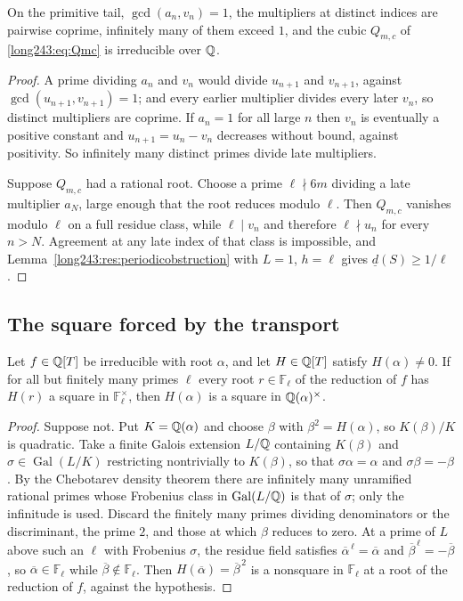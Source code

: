 \documentclass[11pt]{article}
\newcommand{\Fp}{\mathbb{F}}
\DeclareMathOperator{\Gal}{Gal}
\begin{document}
\begin{lemma}\label{long243:res:reduciblecase}
On the primitive tail, $\gcd(a_n,v_n)=1$, the multipliers at distinct indices
are pairwise coprime, infinitely many of them exceed $1$, and the cubic
$Q_{m,c}$ of \eqref{long243:eq:Qmc} is irreducible over $\mathbb{Q}$.
\end{lemma}

\begin{proof}
A prime dividing $a_n$ and $v_n$ would divide $u_{n+1}$ and $v_{n+1}$, against
$\gcd(u_{n+1},v_{n+1})=1$; and every earlier multiplier divides every later
$v_n$, so distinct multipliers are coprime.  If $a_n=1$ for all large $n$ then
$v_n$ is eventually a positive constant and $u_{n+1}=u_n-v_n$ decreases without
bound, against positivity.  So infinitely many distinct primes divide late
multipliers.

Suppose $Q_{m,c}$ had a rational root.  Choose a prime $\ell\nmid6m$ dividing a
late multiplier $a_N$, large enough that the root reduces modulo $\ell$.  Then
$Q_{m,c}$ vanishes modulo $\ell$ on a full residue class, while $\ell\mid v_n$
and therefore $\ell\nmid u_n$ for every $n>N$.  Agreement at any late index of
that class is impossible, and
Lemma~\ref{long243:res:periodicobstruction} with $L=1$, $h=\ell$ gives
$\underline d(S)\ge1/\ell$.
\end{proof}

\subsection{The square forced by the transport}

\begin{lemma}\label{long243:res:squarespec}
Let $f\in\mathbb{Q}[T]$ be irreducible with root $\alpha$, and let $H\in\mathbb{Q}[T]$ satisfy
$H(\alpha)\ne0$.  If for all but finitely many primes $\ell$ every root
$r\in\Fp_\ell$ of the reduction of $f$ has $H(r)$ a square in $\Fp_\ell^\times$,
then $H(\alpha)$ is a square in $\mathbb{Q}(\alpha)^\times$.
\end{lemma}

\begin{proof}
Suppose not.  Put $K=\mathbb{Q}(\alpha)$ and choose $\beta$ with $\beta^2=H(\alpha)$,
so $K(\beta)/K$ is quadratic.  Take a finite Galois extension $L/\mathbb{Q}$ containing
$K(\beta)$ and $\sigma\in\Gal(L/K)$ restricting nontrivially to $K(\beta)$, so
that $\sigma\alpha=\alpha$ and $\sigma\beta=-\beta$.  By the Chebotarev density
theorem there are infinitely many unramified rational primes whose Frobenius
class in $\Gal(L/\Q)$ is that of $\sigma$; only the infinitude is used.
Discard the finitely many primes dividing denominators or the discriminant,
the prime $2$, and those at which $\beta$ reduces to zero.  At a prime of $L$
above such an $\ell$ with Frobenius $\sigma$, the residue field satisfies
$\overline\alpha^{\,\ell}=\overline\alpha$ and
$\overline\beta^{\,\ell}=-\overline\beta$, so $\overline\alpha\in\Fp_\ell$ while
$\overline\beta\notin\Fp_\ell$.  Then $H(\overline\alpha)=\overline\beta^{\,2}$
is a nonsquare in $\Fp_\ell$ at a root of the reduction of $f$, against the
hypothesis.
\end{proof}
\end{document}
